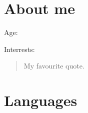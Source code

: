 \begin{CVsidebar}

\section{About me}
Age:  \par
Interrests: 

\vspace{\baselineskip}
\begin{quote}
    My favourite quote.
\end{quote}

\section{Languages}

%
%
%
%
%
%

\LngTextCEFR


\end{CVsidebar}

